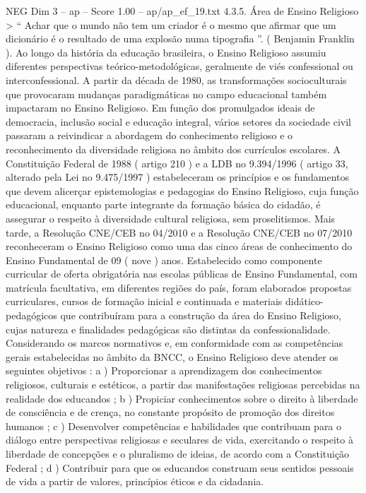 \begin{textsample}{NEG Dim 3 – ap – Score 1.00 – ap/ap\_ef\_19.txt}  \label{ex:f3_neg_101}
4.3.5.
Área de Ensino Religioso > “ Achar que o mundo não tem um criador é o mesmo que afirmar que um dicionário é o resultado de uma explosão numa tipografia ”. ( Benjamin Franklin ).
Ao longo da história da educação brasileira, o Ensino Religioso assumiu diferentes perspectivas teórico-metodológicas, geralmente de viés confessional ou interconfessional.
A partir da década de 1980, as transformações socioculturais que provocaram mudanças paradigmáticas no campo educacional também impactaram no Ensino Religioso.
Em função dos promulgados ideais de democracia, inclusão social e educação integral, vários setores da sociedade civil passaram a reivindicar a abordagem do conhecimento religioso e o reconhecimento da diversidade religiosa no âmbito dos currículos escolares.
A Constituição Federal de 1988 ( artigo 210 ) e a LDB no 9.394/1996 ( artigo 33, alterado pela Lei no 9.475/1997 ) estabeleceram os princípios e os fundamentos que devem alicerçar epistemologias e pedagogias do Ensino Religioso, cuja função educacional, enquanto parte integrante da formação básica do cidadão, é assegurar o respeito à diversidade cultural religiosa, sem proselitismos.
Mais tarde, a Resolução CNE/CEB no 04/2010 e a Resolução CNE/CEB no 07/2010 reconheceram o Ensino Religioso como uma das cinco áreas de conhecimento do Ensino Fundamental de 09 ( nove ) anos.
Estabelecido como componente curricular de oferta obrigatória nas escolas públicas de Ensino Fundamental, com matrícula facultativa, em diferentes regiões do país, foram elaborados propostas curriculares, cursos de formação inicial e continuada e materiais didático-pedagógicos que contribuíram para a construção da área do Ensino Religioso, cujas natureza e finalidades pedagógicas são distintas da confessionalidade.
Considerando os marcos normativos e, em conformidade com as competências gerais estabelecidas no âmbito da BNCC, o Ensino Religioso deve atender os seguintes objetivos : a ) Proporcionar a aprendizagem dos conhecimentos religiosos, culturais e estéticos, a partir das manifestações religiosas percebidas na realidade dos educandos ; b ) Propiciar conhecimentos sobre o direito à liberdade de consciência e de crença, no constante propósito de promoção dos direitos humanos ; c ) Desenvolver competências e habilidades que contribuam para o diálogo entre perspectivas religiosas e seculares de vida, exercitando o respeito à liberdade de concepções e o pluralismo de ideias, de acordo com a Constituição Federal ; d ) Contribuir para que os educandos construam seus sentidos pessoais de vida a partir de valores, princípios éticos e da cidadania.

\end{textsample}
